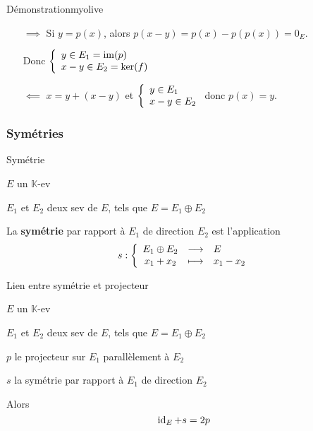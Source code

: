     \begin{demo}{Démonstration}{myolive}
        \begin{itemize}
            \item[$\implies$] Si $y = p(x)$, alors $p(x-y) = p(x)- p(p(x)) = 0_E$.
    
            Donc $\et{y \in E_1 = \im(p)}{x-y \in E_2 = \ker(f)}$
            \item[$\impliedby$] $ x = y + (x-y)$ et $\et{y \in E_1}{x-y \in E_2}$ donc $p(x) = y$.
        \end{itemize}
    \end{demo}
    
    \subsubsection{Symétries}
    
    \begin{defi}{Symétrie}{}
        \begin{soient}
            \item $E$ un $\mathbb{K}$-ev
            \item $E_1$ et $E_2$ deux sev de $E$, tels que $E = E_1 \oplus E_2$
        \end{soient}
        La \textbf{symétrie} par rapport à $E_1$ de direction $E_2$ est l’application \[ \fonction{s}{E_1 \oplus E_2}{E}{x_1 + x_2}{x_1 - x_2} \]
    \end{defi}
    
    \begin{prop}{Lien entre symétrie et projecteur}{}
        \begin{soient}
            \item $E$ un $\mathbb{K}$-ev
            \item $E_1$ et $E_2$ deux sev de $E$, tels que $E = E_1 \oplus E_2$
            \item $p$ le projecteur sur $E_1$ parallèlement à $E_2$
            \item $s$ la symétrie par rapport à $E_1$ de direction $E_2$
        \end{soient}
        Alors \[ \operatorname{id}_E + s = 2p \]
    \end{prop}
    
